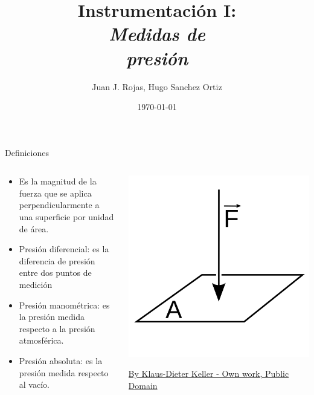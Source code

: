 \documentclass[aspectratio=169]{beamer}
\title{Instrumentación I: \\ \emph{Medidas de}\\ \emph{presión   }}
\author{
    Juan J. Rojas, Hugo Sanchez Ortiz
}
\institute{Instituto Tecnológico de Costa Rica}
\date{\today}
\begin{document}

\maketitle

\newcommand{\blackandwhite}{white} %

\begin{frame}{Definiciones}
    \begin{columns}[c, onlytextwidth]
        \begin{column}{0.50\textwidth}
            \begin{itemize}
                \item Es la magnitud de la fuerza que se aplica perpendicularmente a una superficie por unidad de área. 
                \item Presión diferencial: es la diferencia de presión entre dos puntos de medición
                \item Presión manométrica: es la presión medida respecto a la presión atmosférica. 
                \item Presión absoluta: es la presión medida respecto al vacío. 
            \end{itemize}
        \end{column}
        \begin{column}{0.45\textwidth}
            \includegraphics[width = 0.8\linewidth]{fig/pressure.png}
            
            \tiny{\href{https://commons.wikimedia.org/w/index.php?curid=25665611}{By Klaus-Dieter Keller - Own work, Public Domain}}
        \end{column}
    \end{columns}
\end{frame}
\end{document}
